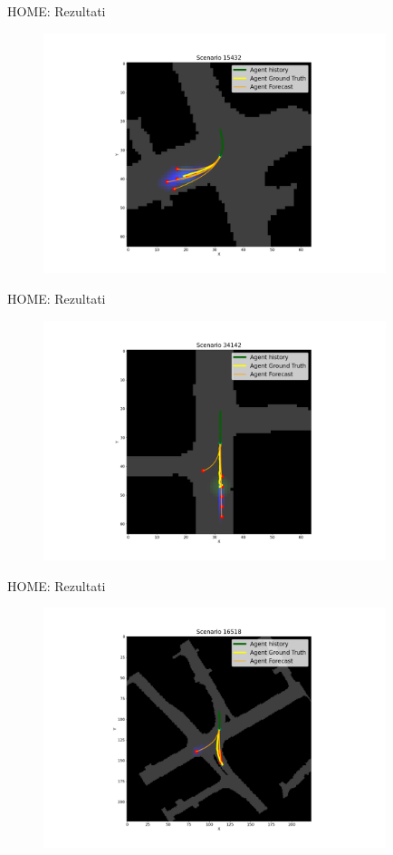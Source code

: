 \documentclass[bookmarks=true,bookmarksopen=true,pdfborder={0 0 0},pdfhighlight={/N},linkbordercolor={.5 .5 .5},implicit=false,unicode,xcolor={table}]{beamer}
\begin{document}
\begin{frame}{HOME: Rezultati}
  \begin{figure}
		\includegraphics[width=10cm,height=7cm]{home_PIT_15432.png}
	\end{figure}
\end{frame}


\begin{frame}{HOME: Rezultati}
  \begin{figure}
		\includegraphics[width=10cm,height=7cm]{home_MIA_34142.png}
	\end{figure}
\end{frame}

\begin{frame}{HOME: Rezultati}
  \begin{figure}
		\includegraphics[width=10cm,height=7cm]{home_full_MIA_16518.png}
	\end{figure}
\end{frame}
\end{document}
